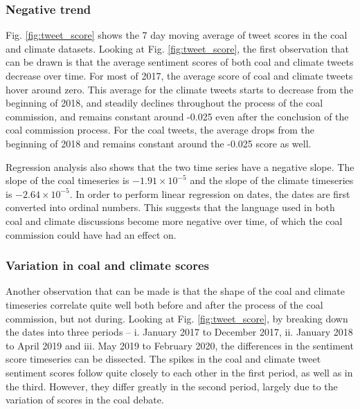 \documentclass[12pt,onecolumn,twoside]{layout}
\begin{document}
\subsubsection*{Negative trend} %
Fig. \ref{fig:tweet_score} shows the 7 day moving average of tweet scores in the coal and climate datasets. Looking at Fig. \ref{fig:tweet_score}, the first observation that can be drawn is that the average sentiment scores of both coal and climate tweets decrease over time. For most of 2017, the average score of coal and climate tweets hover around zero. This average for the climate tweets starts to decrease from the beginning of 2018, and steadily declines throughout the process of the coal commission, and remains constant around -0.025 even after the conclusion of the coal commission process. For the coal tweets, the average drops from the beginning of 2018 and remains constant around the -0.025 score as well. 

Regression analysis also shows that the two time series have a negative slope. The slope of the coal timeseries is $-1.91 \times 10^{-5}$ and the slope of the climate timeseries is $-2.64 \times 10^{-5}$. In order to perform linear regression on dates, the dates are first converted into ordinal numbers. This suggests that the language used in both coal and climate discussions become more negative over time, of which the coal commission could have had an effect on. 


\subsubsection*{Variation in coal and climate scores} %
Another observation that can be made is that the shape of the coal and climate timeseries correlate quite well both before and after the process of the coal commission, but not during. Looking at Fig. \ref{fig:tweet_score}, by breaking down the dates into three periods -- i. January 2017 to December 2017, ii. January 2018 to April 2019 and iii. May 2019 to February 2020, the differences in the sentiment score timeseries can be dissected. The spikes in the coal and climate tweet sentiment scores follow quite closely to each other in the first period, as well as in the third. However, they differ greatly in the second period, largely due to the variation of scores in the coal debate. 
\end{document}
